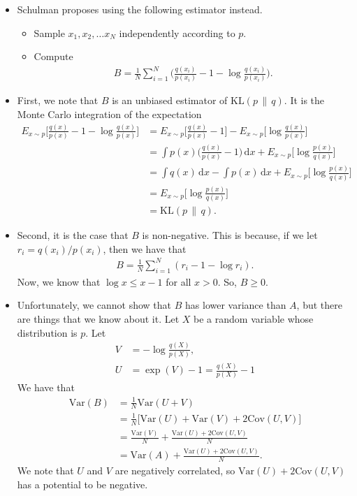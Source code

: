\documentclass[10pt]{article}
\newcommand{\dee}{\mathrm{d}}
\newcommand{\Cov}{\mathrm{Cov}}
\newcommand{\Var}{\mathrm{Var}}
\newcommand{\mrm}[1]{\mathrm{#1}}
\begin{document}
\begin{itemize}
	\item Schulman proposes using the following estimator instead.
	\begin{itemize}
		\item Sample $x_1, x_2, \dotsc x_N$ independently according to $p$.
		\item Compute
		\begin{align*}
			B = \frac{1}{N} \sum_{i=1}^N \bigg( \frac{q(x_i)}{p(x_i)} - 1 - \log \frac{q(x_i)}{p(x_i)} \bigg).
		\end{align*}
	\end{itemize}

	\item First, we note that $B$ is an unbiased estimator of $\mrm{KL}(p\,\|\,q)$. It is the Monte Carlo integration of the expectation
	\begin{align*}
		E_{x \sim p} \bigg[ \frac{q(x)}{p(x)} - 1 - \log \frac{q(x)}{p(x)} \bigg]
		&= E_{x \sim p} \bigg[ \frac{q(x)}{p(x)} - 1 \bigg] - E_{x \sim p}\bigg[\log \frac{q(x)}{p(x)} \bigg] \\
		&= \int p(x) \bigg( \frac{q(x)}{p(x)} - 1 \bigg)\, \dee x  + E_{x \sim p}\bigg[\log \frac{p(x)}{q(x)} \bigg] \\
		&= \int q(x)\, \dee x - \int p(x)\, \dee x  + E_{x \sim p}\bigg[\log \frac{p(x)}{q(x)} \bigg] \\
		&= E_{x \sim p}\bigg[\log \frac{p(x)}{q(x)} \bigg] \\
		&= \mrm{KL}(p\,\|\,q).
	\end{align*}

	\item Second, it is the case that $B$ is non-negative. This is because, if we let $r_i = q(x_i)/p(x_i)$, then we have that
	\begin{align*}
		B = \frac{1}{N} \sum_{i=1}^N (r_i - 1 - \log r_i).
	\end{align*}
	Now, we know that $\log x \leq x - 1$ for all $x > 0$. So, $B \geq 0$.

	\item Unfortunately, we cannot show that $B$ has lower variance than $A$, but there are things that we know about it. Let $X$ be a random variable whose distribution is $p$. Let 
	\begin{align*}
		V &= - \log \frac{q(X)}{p(X)}, \\
		U &= \exp(V) - 1 = \frac{q(X)}{p(X)} - 1
	\end{align*}
	We have that
	\begin{align*}
		\Var(B) 
		&= \frac{1}{N} \Var(U+V) \\
		&= \frac{1}{N}\big[ \Var(U) + \Var(V) + 2\Cov(U,V)  \big] \\
		&= \frac{\Var(V)}{N}  + \frac{\Var(U) + 2\Cov(U,V)}{N} \\
		&= \Var(A) + \frac{\Var(U) + 2\Cov(U,V)}{N}.
	\end{align*}
	We note that $U$ and $V$ are negatively correlated, so $\Var(U) + 2\Cov(U,V)$ has a potential to be negative.
\end{itemize}


  
\end{document}
